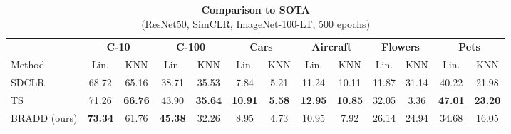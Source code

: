 \begin{table}[t]
\centering
\setlength{\tabcolsep}{2pt}
\caption{\centering \textbf{Comparison to SOTA}\\(ResNet50, SimCLR, ImageNet-100-LT, 500 epochs)}
{\begin{tabular}{l cc cc cc cc cc cc}
    \toprule
     & \multicolumn{2}{c}{\textbf{C-10}} &  \multicolumn{2}{c}{\textbf{C-100}}  &  \multicolumn{2}{c}{\textbf{Cars}} &  \multicolumn{2}{c}{\textbf{Aircraft}} &  \multicolumn{2}{c}{\textbf{Flowers}} &  \multicolumn{2}{c}{\textbf{Pets}} \\
     \cmidrule(r){2-3}
     \cmidrule(l){4-5}
     \cmidrule(l){6-7}
     \cmidrule(l){8-9}
     \cmidrule(l){10-11}
     \cmidrule(l){12-13}
    Method & Lin. & KNN & Lin. & KNN & Lin. & KNN & Lin. & KNN & Lin. & KNN & Lin. & KNN \\
    \midrule
    
     \multirow{1}{*}{SDCLR \cite{sdclr}}        & 68.72   &  65.16 & 38.71 & 35.53 & 7.84 & 5.21 & 11.24 & 10.11 & 11.87 & 31.14 & 40.22 & 21.98 \\
    \multirow{1}{*}{TS \cite{ts}}    & 71.26 &  \textbf{66.76} & 43.90 & \textbf{35.64} & \textbf{10.91} & \textbf{5.58} & \textbf{12.95} & \textbf{10.85} & 32.05 & 3.36 & \textbf{47.01} & \textbf{23.20} \\
    \multirow{1}{*}{BRADD (ours)}     & \textbf{73.34}  &  61.76 & \textbf{45.38} & 32.26 & 8.95 & 4.73 & 10.95 & 7.92 & 26.14 & 24.94 & 34.68 & 16.05 \\
    \bottomrule
\end{tabular}
\label{table:sota_comp}}
\end{table}

